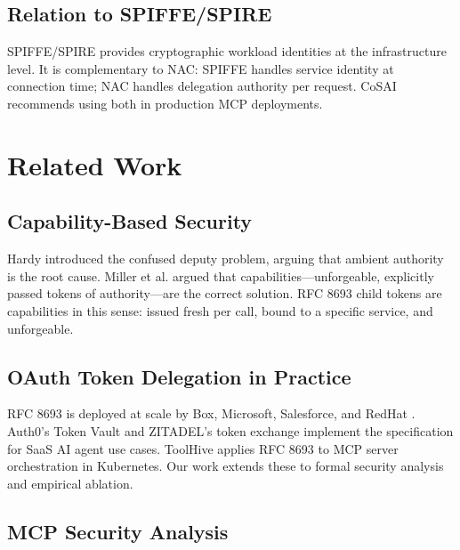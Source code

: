 \documentclass[journal]{IEEEtran}
\begin{document}
\subsection{Relation to SPIFFE/SPIRE}

SPIFFE/SPIRE \cite{spiffe} provides cryptographic workload identities at the
infrastructure level. It is complementary to NAC: SPIFFE handles service
identity at connection time; NAC handles delegation authority per request. CoSAI
\cite{cosai_mcp} recommends using both in production MCP deployments.


\FloatBarrier  %

\section{Related Work}
\label{sec:related}

\subsection{Capability-Based Security}

Hardy \cite{hardy1988} introduced the confused deputy problem, arguing that
ambient authority is the root cause. Miller et al. \cite{miller2003} argued that
capabilities---unforgeable, explicitly passed tokens of authority---are the
correct solution. RFC 8693 child tokens are capabilities in this sense: issued
fresh per call, bound to a specific service, and unforgeable.

\subsection{OAuth Token Delegation in Practice}

RFC 8693 \cite{rfc8693} is deployed at scale by Box, Microsoft, Salesforce, and
RedHat \cite{rfc8693_deploy}. Auth0's Token Vault \cite{auth0_token_vault} and
ZITADEL's token exchange \cite{zitadel_te} implement the specification for SaaS
AI agent use cases. ToolHive \cite{toolhive} applies RFC 8693 to MCP server
orchestration in Kubernetes. Our work extends these to formal security analysis
and empirical ablation.

\subsection{MCP Security Analysis}
\end{document}
